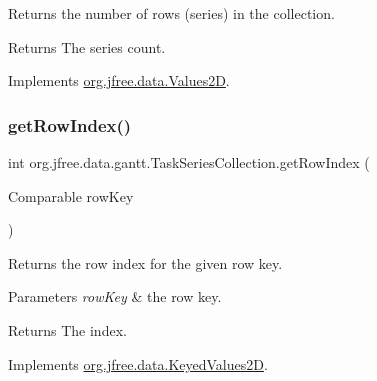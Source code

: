 Returns the number of rows (series) in the collection.

\begin{DoxyReturn}{Returns}
The series count. 
\end{DoxyReturn}


Implements \mbox{\hyperlink{interfaceorg_1_1jfree_1_1data_1_1_values2_d_a9ce939b45128515a9841a7d018a6ad0e}{org.\+jfree.\+data.\+Values2D}}.

\mbox{\label{classorg_1_1jfree_1_1data_1_1gantt_1_1_task_series_collection_a4398f6c557565408f40cda1e11e16a08}} 
\subsubsection{\texorpdfstring{get\+Row\+Index()}{getRowIndex()}}
{\footnotesize\ttfamily int org.\+jfree.\+data.\+gantt.\+Task\+Series\+Collection.\+get\+Row\+Index (\begin{DoxyParamCaption}\item[{Comparable}]{row\+Key }\end{DoxyParamCaption})}

Returns the row index for the given row key.


\begin{DoxyParams}{Parameters}
{\em row\+Key} & the row key.\\
\hline
\end{DoxyParams}
\begin{DoxyReturn}{Returns}
The index. 
\end{DoxyReturn}


Implements \mbox{\hyperlink{interfaceorg_1_1jfree_1_1data_1_1_keyed_values2_d_ae92ded12999f2872687a5754ddf29254}{org.\+jfree.\+data.\+Keyed\+Values2D}}.

\mbox{\label{classorg_1_1jfree_1_1data_1_1gantt_1_1_task_series_collection_adf6c7e868a48a871bfec44f2a14a00e9}} 
